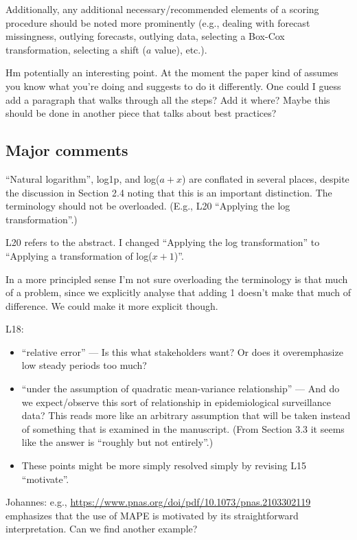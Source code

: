 \documentclass{article}
\newcommand{\red}{\color{red}}
\newcommand{\black}{\color{black}}
\begin{document}
\red
Additionally, any additional necessary/recommended elements of a scoring procedure should be noted more prominently (e.g., dealing with forecast missingness, outlying forecasts, outlying data, selecting a Box-Cox transformation, selecting a shift ($a$ value), etc.).

\black
Hm potentially an interesting point. At the moment the paper kind of assumes you know what you're doing and suggests to do it differently. One could I guess add a paragraph that walks through all the steps? Add it where? Maybe this should be done in another piece that talks about best practices? 

\red

\subsection{Major comments}
``Natural logarithm'', log1p, and log($a + x$) are conflated in several places, despite the discussion in Section 2.4 noting that this is an important distinction. The terminology should not be overloaded. (E.g., L20 ``Applying the log transformation''.)

\black
L20 refers to the abstract. I changed ``Applying the log transformation'' to ``Applying a transformation of log($x + 1$)''. 

In a more principled sense I'm not sure overloading the terminology is that much of a problem, since we explicitly analyse that adding 1 doesn't make that much of difference. We could make it more explicit though. 


\red
L18:
\begin{itemize}
    \item ``relative error'' --- Is this what stakeholders want? Or does it overemphasize low steady periods too much?
    \item ``under the assumption of quadratic mean-variance relationship'' --- And do we expect/observe this sort of relationship in epidemiological surveillance data? This reads more like an arbitrary assumption that will be taken instead of something that is examined in the manuscript. (From Section 3.3 it seems like the answer is ``roughly but not entirely''.)
    \item These points might be more simply resolved simply by revising L15 ``motivate''.
\end{itemize}
\black 

Johannes: e.g., \url{https://www.pnas.org/doi/pdf/10.1073/pnas.2103302119} emphasizes that the use of MAPE is motivated by its straightforward interpretation. Can we find another example?
\end{document}
